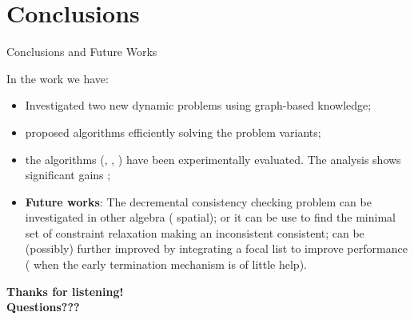 \section*{Conclusions}

\begin{frame}{Conclusions and Future Works}

    In the work we have:
    \begin{itemize}
        \item Investigated two new dynamic problems using graph-based knowledge;
        \item proposed algorithms efficiently solving the problem variants;
        \item the algorithms (\DPASATAlgorithmName{}, \DOHSATAlgorithmName{}, \CPDSearch{}) have been experimentally evaluated. The analysis shows significant gains \wrt{} \stateofart{};

        \item \textbf{Future works}: 
            The decremental consistency checking problem can be investigated in other algebra (\eg{} spatial); 
            or it can be use to find the minimal set of constraint relaxation making an inconsistent \TCSPName{} consistent;
            \CPDSearch{} can be (possibly) further improved by integrating a focal list to improve performance (\eg{} when the early termination mechanism is of little help).
    \end{itemize}
\end{frame}

\begin{frame}[plain]
    \centering \Huge \textbf{Thanks for listening!\\Questions???}
\end{frame}
